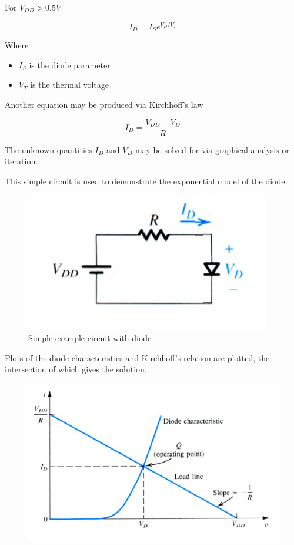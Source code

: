 \documentclass[10pt]{article}
\begin{document}
For $ V_{DD} > 0.5V $ 

\begin{equation}
	I_D = I_S e^{V_D/V_T}
	\label{eq:360:forward_conducting_diode}
\end{equation}

Where 
\begin{itemize}
	\item $ I_S $ is the diode parameter
	\item $ V_T $ is the thermal voltage
\end{itemize}

Another equation may be produced via Kirchhoff's law

\begin{equation}
I_D = \frac{V_{DD} - V_D}{R}
 \label{eq:360:forward_conducting_diode_kirchhoff}
\end{equation}



The unknown quantities $ I_D $ and $ V_D $ may be solved for via graphical analysis or iteration.

\begin{example}

	This simple circuit is used to demonstrate the exponential model of the diode.
	\begin{figure}[H]
		\centering
		\includegraphics[width=0.8\linewidth]{img/image_2022-09-16-22-33-11.png}
		\caption{Simple example circuit with diode}
		\label{fig:360:forward_conducting_diode_example}
	\end{figure}
	
	Plots of the diode characteristics and Kirchhoff's relation are plotted, the intersection of which gives the solution.

	\begin{figure}[H]
		\centering
		\includegraphics[width=0.8\linewidth]{img/image_2022-09-16-22-32-51.png}
	\end{figure}
\end{example}
\end{document}
